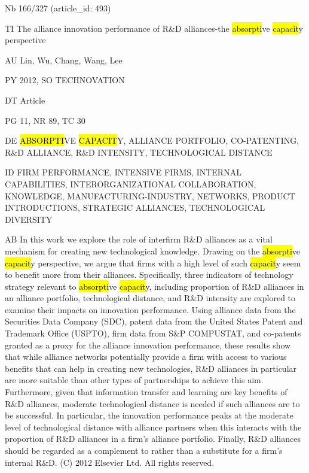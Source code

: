 \documentclass[a4paper]{article}
\begin{document}
\vspace*{-2cm}
Nb \tabto{0cm}166/327 (article\_id: 493)\par
TI \tabto{0cm}The alliance innovation performance of R\&D alliances-the \hl{absorpti}ve \hl{capacit}y perspective\par
AU \tabto{0cm}Lin, Wu, Chang, Wang, Lee\par
PY \tabto{0cm}2012, SO TECHNOVATION\par
DT \tabto{0cm}Article\par
PG \tabto{0cm}11, NR 89, TC 30\par
DE \tabto{0cm}\hl{ABSORPTI}VE \hl{CAPACIT}Y, ALLIANCE PORTFOLIO, CO-PATENTING, R\&D ALLIANCE, R\&D INTENSITY, TECHNOLOGICAL DISTANCE\par
ID \tabto{0cm}FIRM PERFORMANCE, INTENSIVE FIRMS, INTERNAL CAPABILITIES, INTERORGANIZATIONAL COLLABORATION, KNOWLEDGE, MANUFACTURING-INDUSTRY, NETWORKS, PRODUCT INTRODUCTIONS, STRATEGIC ALLIANCES, TECHNOLOGICAL DIVERSITY\par
AB \tabto{0cm}In this work we explore the role of interfirm R\&D alliances as a vital mechanism for creating new technological knowledge. Drawing on the \hl{absorpti}ve \hl{capacit}y perspective, we argue that firms with a high level of such \hl{capacit}y seem to benefit more from their alliances. Specifically, three indicators of technology strategy relevant to \hl{absorpti}ve \hl{capacit}y, including proportion of R\&D alliances in an alliance portfolio, technological distance, and R\&D intensity are explored to examine their impacts on innovation performance. Using alliance data from the Securities Data Company (SDC), patent data from the United States Patent and Trademark Office (USPTO), firm data from S\&P COMPUSTAT, and co-patents granted as a proxy for the alliance innovation performance, these results show that while alliance networks potentially provide a firm with access to various benefits that can help in creating new technologies, R\&D alliances in particular are more suitable than other types of partnerships to achieve this aim. Furthermore, given that information transfer and learning are key benefits of R\&D alliances, moderate technological distance is needed if such alliances are to be successful. In particular, the innovation performance peaks at the moderate level of technological distance with alliance partners when this interacts with the proportion of R\&D alliances in a firm's alliance portfolio. Finally, R\&D alliances should be regarded as a complement to rather than a substitute for a firm's internal R\&D. (C) 2012 Elsevier Ltd. All rights reserved.\par
\clearpage
\end{document}
